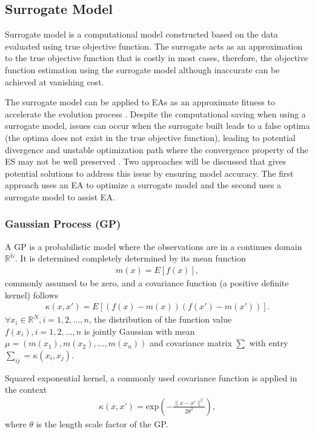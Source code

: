 \subsection{Surrogate Model} 

Surrogate model is a computational model constructed based on the data evaluated using true objective function. The surrogate acts as an approximation to the true objective function that is costly in most cases, therefore, the objective function estimation using the surrogate model although inaccurate can be achieved at vanishing cost. 

The surrogate model can be applied to EAs as an approximate fitness to accelerate the evolution process \cite{Ratle:1998:ACE:645824.668750}. Despite the computational saving when using a surrogate model, issues can occur when the surrogate built leads to a false optima (the optima does not exist in the true objective function), leading to potential divergence and unstable optimization path where the convergence property of the ES may not be well preserved \cite{JIN201161}. Two approaches will be discussed that gives potential solutions to address this issue by ensuring model accuracy. The first approach uses an EA to optimize a surrogate model and the second uses a surrogate model to assist EA. 


\subsubsection{Gaussian Process (GP)}\label{sssec:GP}\hfill

A GP is a probabilistic model where the observations are in a continues domain $\mathbb{R^N}$. It is determined completely determined by its mean function 
\begin{align}
m(x) = E [ f(x)],
\end{align}
commonly assumed to be zero, and a covariance function (a positive definite kernel) follows
\begin{align}
\kappa(x, x \prime) = E[(f(x)-m(x))(f(x \prime)-m(x \prime))].		
\end{align} 
$\forall x_i \in \mathbb{R}^N, i=1,2,...,n$, the distribution of the function value $f(x_i),i=1,2,...,n$ is jointly Gaussian with mean $\mu = (m(x_1),m(x_2),...,m(x_n))$ and covariance matrix $\sum$ with entry $\sum_{ij} = \kappa (x_i,x_j)$. 

Squared exponential kernel, a commonly used covariance function is applied in the context 
\begin{align}
\kappa(x, x \prime) = \text{exp} \left( - \frac{\|x - x \prime \|^2}{2 \theta^2} \right),
\end{align}
where $\theta$ is the length scale factor of the GP.

